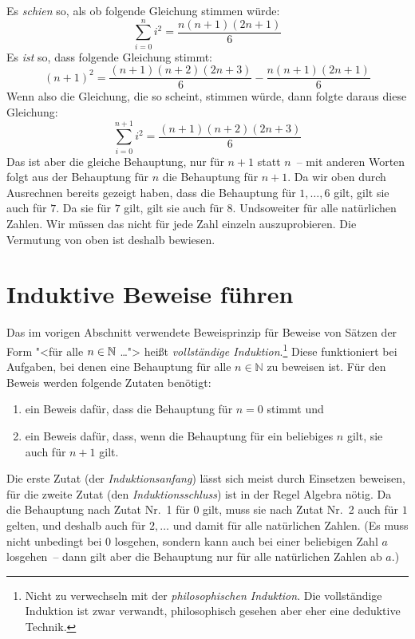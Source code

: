 Es \emph{schien} so, als ob folgende Gleichung stimmen würde:
%
\begin{displaymath}
  \sum_{i=0}^n i^2 = \dfrac{n(n+1)(2n+1)}{6}
\end{displaymath}
%
Es \emph{ist} so, dass folgende Gleichung stimmt:
%
\[ (n+1)^2 = \dfrac{(n+1)(n+2)(2n+3)}{6} - \dfrac{n(n+1)(2n+1)}{6}\]
%
Wenn also die Gleichung, die so scheint, stimmen würde, dann folgte
daraus diese Gleichung:
%
\begin{displaymath}
  \sum_{i=0}^{n+1} i^2 = \dfrac{(n+1)(n+2)(2n+3)}{6}
\end{displaymath}
%
Das ist aber die gleiche Behauptung, nur für $n+1$ statt $n$~-- mit
anderen Worten folgt aus der Behauptung für $n$ die Behauptung für
$n+1$.  Da wir oben durch Ausrechnen bereits gezeigt haben, dass die
Behauptung für $1,\ldots,6$ gilt, gilt sie auch für $7$.  Da sie für
$7$ gilt, gilt sie auch für $8$.  Undsoweiter für alle natürlichen
Zahlen.  Wir müssen das nicht für jede Zahl einzeln auszuprobieren.  Die Vermutung
von oben ist deshalb bewiesen.

\section{Induktive Beweise führen}
\label{sec:nat-induction-ka}
\label{page:mathematical-induction}
Das im vorigen Abschnitt verwendete Beweisprinzip für Beweise 
von Sätzen der Form "<für alle $n\in\mathbb{N}$ \ldots">
heißt
\textit{vollständige Induktion}.\footnote{Nicht zu
verwechseln mit der \textit{philosophischen Induktion}.  Die
vollständige Induktion ist zwar verwandt, philosophisch gesehen aber
eher eine deduktive Technik.}  Diese
funktioniert bei Aufgaben, bei denen eine Behauptung für alle
$n\in\mathbb{N}$ zu beweisen ist.  Für den Beweis werden folgende
Zutaten benötigt:
%
\begin{enumerate}
\item ein Beweis dafür, dass die Behauptung für $n=0$ stimmt und
\item ein Beweis dafür, dass, wenn die Behauptung für ein beliebiges
  $n$ gilt, sie auch für $n+1$ gilt.
\end{enumerate}
%
Die erste Zutat (der
\textit{Induktionsanfang}) lässt sich meist
durch Einsetzen beweisen, für die zweite Zutat (den
\textit{Induktionsschluss}) ist in der Regel Algebra
nötig.  Da die Behauptung nach Zutat Nr.~1 für $0$ gilt, muss sie nach
Zutat Nr.~2 auch für $1$ gelten, und deshalb auch für $2,\ldots$ und
damit für alle natürlichen Zahlen.  (Es muss nicht unbedingt bei $0$
losgehen, sondern kann auch bei einer beliebigen Zahl $a$ losgehen~--
dann gilt aber die Behauptung nur für alle natürlichen Zahlen ab $a$.)


